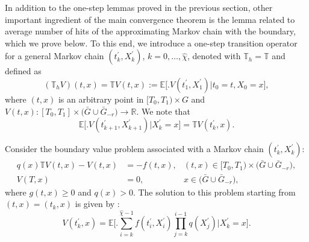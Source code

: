 \documentclass{article}
\theoremstyle{definition}
\numberwithin{equation}{section}
\begin{document}
In addition to the one-step lemmas proved in the previous section, other important ingredient of the main convergence theorem is the lemma related to average number of hits of the approximating Markov chain with the boundary, which we prove below. To this end, we introduce a one-step transition operator for a general  Markov chain $(t_{k}^{'},X_{k}^{'})$, $k=0,\ldots,\hat{\chi}$, denoted with $\mathbb{T}_h=\mathbb{T}$ and defined as
\begin{equation*}
    (\mathbb{T}_h V)(t,x) = \mathbb{T}V(t,x) := \mathbb{E}\big[ \big . V(t_1^{'}, X_{1}^{'}) \big | t_{0}=t, X_{0}=x\big],
\end{equation*}
where $(t,x)$ is an arbitrary point in $[T_{0}, T_1)\times G$
and $V(t,x) :  [T_{0}, T_1]\times \big(\bar G \cup \bar{G}_{-r}\big) \rightarrow \mathbb{R}$.
We note that
\begin{equation*}
\mathbb{E}\big[ \big . V(t_{k+1}^{'}, X_{k+1}^{'}) \big | X_{k}^{'}=x\big]
=\mathbb{T} V(t_k^{'},x).
\end{equation*}

Consider the boundary value problem associated with a Markov chain $(t_{k}^{'},X_{k}^{'})$:
\begin{align}
    q(x) \mathbb{T}V(t,x) - V(t,x) &= -f(t,x),  &(t,x) \in [T_{0}, T_1)\times \big(\bar{G}\cup \bar{G}_{-r}\big), \label{eq:18} \\
    V(T,x) &= 0,       &x \in  \big(\bar{G} \cup \bar{G}_{-r}\big),\label{eq:19}
\end{align}
where $g(t,x) \geq 0$ and $q(x) > 0$. The solution to this problem starting from $(t,x)=(t_k,x)$ is given by \cite{20, 46, mil_tretyakov_book}:
\begin{equation}
    V(t_k^{'},x) =  \mathbb{E}\bigg[ \bigg . \sum\limits_{i=k}^{\hat\chi-1}f(t_{i}^{'},X_{i}^{'})\prod\limits_{j=k}^{i-1}q(X_{j}^{'}) \bigg | X_{k}^{'}=x\bigg]. \label{eq:20}
\end{equation}
\end{document}

